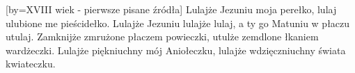 [by={XVIII wiek - pierwsze pisane źródła}]
\beginverse
Lulajże Jezuniu moja perełko,
lulaj ulubione me pieścidełko.
\endverse
\beginchorus
Lulajże Jezuniu lulajże lulaj,
a ty go Matuniu w płaczu utulaj.
\endchorus
\beginverse
Zamknijże zmrużone płaczem powieczki,
utulże zemdlone łkaniem wardżeczki.
\endverse
\beginverse
Lulajże piękniuchny mój Aniołeczku,
lulajże wdzięczniuchny świata kwiateczku.
\endverse
\endsong